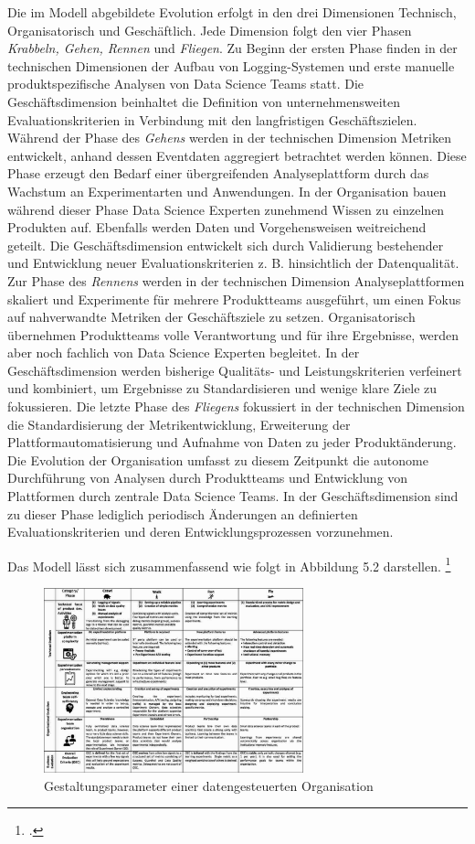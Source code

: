 Die im Modell abgebildete Evolution erfolgt in den drei Dimensionen Technisch, Organisatorisch und Geschäftlich. 
Jede Dimension folgt den vier Phasen \textit{Krabbeln, Gehen, Rennen} und \textit{Fliegen}.
Zu Beginn der ersten Phase finden in der technischen Dimensionen der Aufbau von Logging-Systemen und erste manuelle produktspezifische Analysen von Data Science Teams statt.
Die Geschäftsdimension beinhaltet die Definition von unternehmensweiten Evaluationskriterien in Verbindung mit den langfristigen Geschäftszielen.
Während der Phase des \textit{Gehens} werden in der technischen Dimension Metriken entwickelt, anhand dessen Eventdaten aggregiert betrachtet werden können.
Diese Phase erzeugt den Bedarf einer übergreifenden Analyseplattform durch das Wachstum an Experimentarten und Anwendungen. 
In der Organisation bauen während dieser Phase Data Science Experten zunehmend Wissen zu einzelnen Produkten auf.
Ebenfalls werden Daten und Vorgehensweisen weitreichend geteilt.
Die Geschäftsdimension entwickelt sich durch Validierung bestehender und Entwicklung neuer Evaluationskriterien z. B. hinsichtlich der Datenqualität.
Zur Phase des \textit{Rennens} werden in der technischen Dimension Analyseplattformen skaliert und Experimente für mehrere Produktteams ausgeführt, um einen Fokus auf nahverwandte Metriken der Geschäftsziele zu setzen.
Organisatorisch übernehmen Produktteams volle Verantwortung und für ihre Ergebnisse, werden aber noch fachlich von Data Science Experten begleitet.
In der Geschäftsdimension werden bisherige Qualitäts- und Leistungskriterien verfeinert und kombiniert, um Ergebnisse zu Standardisieren und wenige klare Ziele zu fokussieren.
Die letzte Phase des \textit{Fliegens} fokussiert in der technischen Dimension die Standardisierung der Metrikentwicklung, Erweiterung der Plattformautomatisierung und Aufnahme von Daten zu jeder Produktänderung.
Die Evolution der Organisation umfasst zu diesem Zeitpunkt die autonome Durchführung von Analysen durch Produktteams und Entwicklung von Plattformen durch zentrale Data Science Teams.
In der Geschäftsdimension sind zu dieser Phase lediglich periodisch Änderungen an definierten Evaluationskriterien und deren Entwicklungsprozessen vorzunehmen.

Das Modell lässt sich zusammenfassend wie folgt in Abbildung 5.2 darstellen. \footcite[Vgl.][S. 6]{Fabijan.2017}
\begin{figure}[htb]
    \centering
    \includegraphics[width=0.67\textwidth]{graphics/EEM model.png}
    \caption{Gestaltungsparameter einer datengesteuerten Organisation}
    \label{fig:EEM model}
\end{figure}